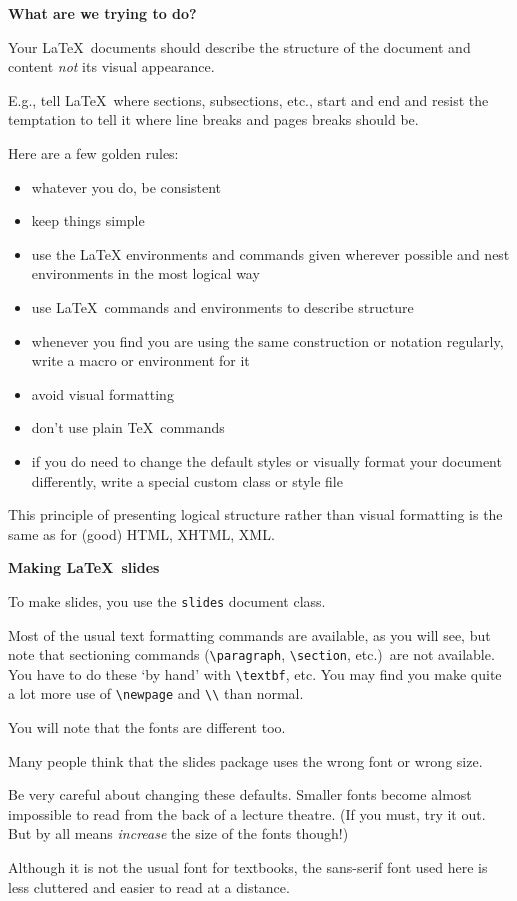 \documentclass[a4paper,landscape]{slides}
\begin{document}
\newpage

\textbf{What are we trying to do?}

Your \LaTeX\ documents should describe the
structure of the document and content \textit{not}
its visual appearance.

E.g., tell \LaTeX\ where sections, subsections, etc., start
and end and resist the temptation to tell it where
line breaks and pages breaks should be.

Here are a few golden rules:
\begin{itemize}\itemsep=0pt
\item whatever you do, be consistent
\item keep things simple
\item use the LaTeX environments and commands given wherever possible
      and nest environments in the most logical way
\item use \LaTeX\ commands and environments to describe structure
\item whenever you find you are using the same construction or notation 
regularly, write a macro or environment for it
\item avoid visual formatting
\item don't use plain \TeX\ commands
\item if you do need to change the default styles or visually format 
your document differently, write a special custom class or style file
\end{itemize}

This principle of presenting logical structure rather than visual
formatting is the same as for (good) HTML, XHTML, XML.

\newpage

\textbf{Making \LaTeX\ slides}

To make slides, you use the \verb|slides| document class.

Most of the usual text formatting commands are available, 
as you will see, but note that sectioning commands (\verb|\paragraph|,
\verb|\section|, etc.)~are not available.  You have to do these
`by hand' with \verb|\textbf|, etc.  You may find you make quite
a lot more use of \verb|\newpage| and \verb|\\| than normal.

\newpage

You will note that the fonts are different too.

Many people think that the slides package uses 
the wrong font or wrong size.  

Be very careful about changing these defaults.  
Smaller fonts become almost impossible to read
from the back of a lecture theatre.  (If you must, 
try it out.  But by all means \textit{increase}
the size of the fonts though!)  

Although it is not the usual font for textbooks,
the sans-serif font used here is less cluttered
and easier to read at a distance.
\end{document}
